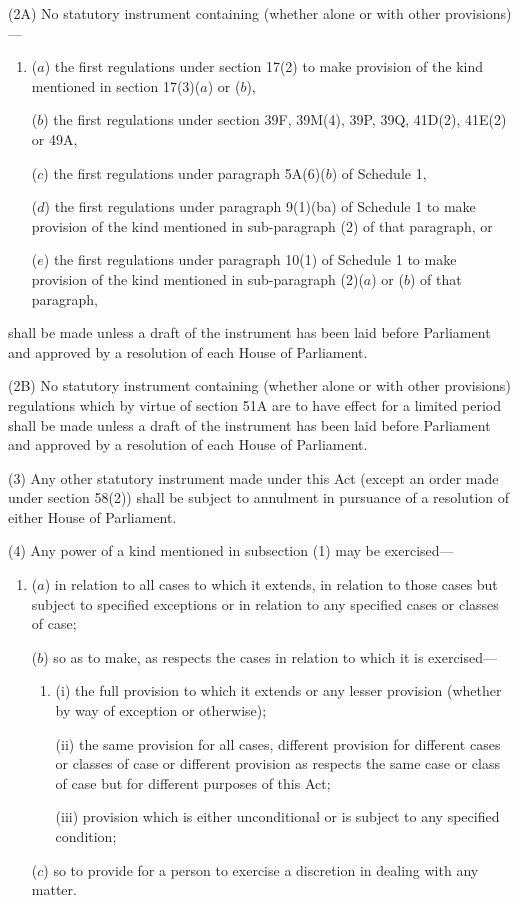 \documentclass[12pt,a4paper]{article}
\begin{document}
(2A) No statutory instrument containing (whether alone or with other provisions)---
\begin{enumerate}\item[]
($a$) the first regulations under section 17(2) to make provision of the kind
mentioned in section 17(3)($a$) or ($b$),

($b$) the first regulations under section 39F, 39M(4), 39P, 39Q, 41D(2), 41E(2) or
49A,

($c$) the first regulations under paragraph 5A(6)($b$) of Schedule 1,

($d$) the first regulations under paragraph 9(1)(ba) of Schedule 1 to make provision
of the kind mentioned in sub-paragraph (2) of that paragraph, or

($e$) the first regulations under paragraph 10(1) of Schedule 1 to make provision
of the kind mentioned in sub-paragraph (2)($a$) or ($b$) of that paragraph,
\end{enumerate}
shall be made unless a draft of the instrument has been laid before Parliament and approved by a resolution of each House of Parliament.

(2B) No statutory instrument containing (whether alone or with other provisions) regulations which by virtue of section 51A are to have effect for a limited period shall be made unless a draft of the instrument has been laid before Parliament and approved by a resolution of each House of Parliament.

(3) Any other statutory instrument made under this Act (except an order made under section 58(2)) shall be subject to annulment in pursuance of a resolution of either House of Parliament.

(4) Any power of a kind mentioned in subsection (1) may be exercised---
\begin{enumerate}\item[]
($a$) in relation to all cases to which it extends, in relation to those cases but
subject to specified exceptions or in relation to any specified cases or
classes of case;

($b$) so as to make, as respects the cases in relation to which it is exercised---
\begin{enumerate}\item[]
(i)
the full provision to which it extends or any lesser provision
(whether by way of exception or otherwise);

(ii)
the same provision for all cases, different provision for different
cases or classes of case or different provision as respects the same
case or class of case but for different purposes of this Act;

(iii) provision which is either unconditional or is subject to any specified
condition;
\end{enumerate}

($c$) so to provide for a person to exercise a discretion in dealing with any
matter.
\end{enumerate}
\end{document}
